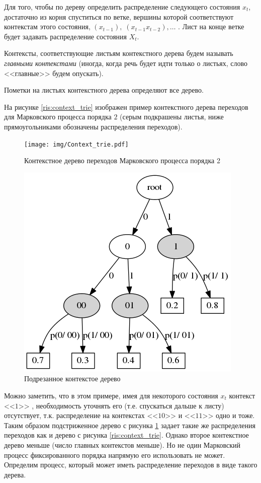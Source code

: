 \documentclass{matmex-diploma-custom}
\begin{document}
Для того, чтобы по дереву определить распределение следующего состояния $ x_{t} $, достаточно из корня спуститься по ветке, вершины которой соответствуют контекстам этого состояния, $(x_{t-1}),\; (x_{t-1}x_{t-2}), \ldots$ . Лист на конце ветке будет задавать распределение состояния $ X_{t} $.

Контексты, соответствующие листьям контекстного дерева будем называть \textit{главными контекстами} (иногда, когда речь будет идти только о листьях, слово <<главные>> будем опускать).

\begin{remark}
Пометки на листьях контекстного дерева определяют все дерево.
\end{remark}

На рисунке \ref{ris:context_trie} изображен пример контекстного дерева переходов для Марковского процесса порядка $ 2 $ (серым подкрашены листья, ниже прямоугольниками обозначены распределения переходов).
\begin{figure}[h!]\centering
\begin{minipage}[b]{0.49 \textwidth}
	\texttt{[image: img/Context\_trie.pdf]}
	\centering
	\caption{ Контекстное дерево переходов Марковского процесса порядка 2 }
	\label{ris:context_trie}
	
\end{minipage}
\hfil \hfil
\begin{minipage}[b]{0.49 \textwidth}
	\includegraphics[scale=0.4]{img/Prune_c_trie.png}
	\centering
	\caption{ Подрезанное контекстое дерево }
	\label{ris:prune_c_trie}
\end{minipage}
\end{figure}
Можно заметить, что в этом примере, имея для некоторого состояния $x_{t}$ контекст  <<$1$>> , необходимость уточнять его (т.е. спускаться дальше к листу) отсутствует, т.к. распределение на контекстах  <<$10$>>  и  <<$11$>>  одно и тоже. 
Таким образом подстриженное дерево с рисунка \ref{ris:prune_c_trie} задает такие же распределения переходов как и дерево с рисунка \ref{ris:context_trie}. 
Однако второе контекстное дерево меньше (число главных контекстов меньше).
Но не один Марковский процесс фиксированного порядка напрямую его использовать не может.
Определим процесс, который может иметь распределение переходов в виде такого дерева.
\end{document}
